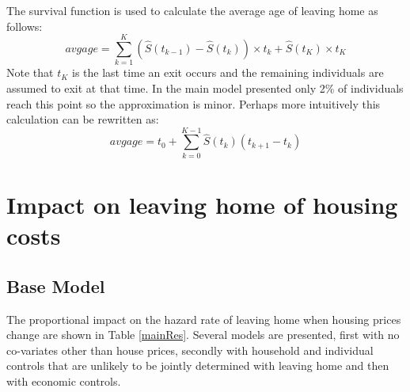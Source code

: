 \documentclass[12pt]{article}
\begin{document}
The survival function is used to calculate the average age of leaving home as follows:
\begin{equation*}
  avgage = \sum_{k = 1}^K (\hat{S}(t_{k-1})-\hat{S}(t_{k})) \times t_k + \hat{S}(t_K) \times t_K
\end{equation*}
Note that $t_K$ is the last time an exit occurs and the remaining individuals are assumed to exit at that time. In the main model presented only 2\% of individuals reach this point so the approximation is minor. Perhaps more intuitively this calculation can be rewritten as:
\begin{equation*}
  avgage = t_0 + \sum_{k = 0}^{K-1} \hat{S}(t_{k})(t_{k+1} - t_{k})
\end{equation*}

\section{Impact on leaving home of housing costs}
\subsection{Base Model}
The proportional impact on the hazard rate of leaving home when housing prices change are shown in Table \ref{mainRes}. Several models are presented, first with no co-variates other than house prices, secondly with household and individual controls that are unlikely to be jointly determined with leaving home and then with economic controls.
\end{document}
